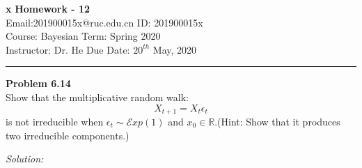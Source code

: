 \documentclass[a4paper, 11pt]{article}
\newenvironment{problem}[2][Problem]
    { \begin{mdframed}[backgroundcolor=gray!20] \textbf{#1 #2} \\}
    {  \end{mdframed}}
\newenvironment{solution}
    {\textit{Solution:}}
    {}
\begin{document}
\noindent
\large\textbf{x} \hfill \textbf{Homework - 12}   \\
Email:201900015x@ruc.edu.cn  \hfill ID: 201900015x \\
\normalsize Course: Bayesian \hfill Term: Spring 2020\\
Instructor: Dr. He \hfill Due Date: $20^{th}$ May, 2020 \\
\noindent\rule{7in}{2.8pt}

\begin{problem}{6.14}
Show that the multiplicative random walk:
$$X_{t+1}=X_t\epsilon_t$$
is not irreducible when $\epsilon_{t} \sim \mathcal{E} x p(1)$ and $x_{0} \in \mathbb{R}$.(Hint: Show that it produces
two irreducible components.) 
\end{problem}
\begin{solution}
    
\end{solution}
\end{document}
